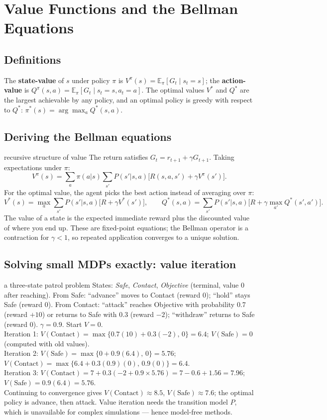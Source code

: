 \documentclass[11pt]{article}
\begin{document}
\section{Value Functions and the Bellman Equations}
\subsection{Definitions}
The \textbf{state-value} of $s$ under policy $\pi$ is $V^\pi(s)=\mathbb E_\pi[G_t\mid s_t=s]$; the \textbf{action-value} is $Q^\pi(s,a)=\mathbb E_\pi[G_t\mid s_t=s,a_t=a]$. The optimal values $V^*$ and $Q^*$ are the largest achievable by any policy, and an optimal policy is greedy with respect to $Q^*$: $\pi^*(s)=\arg\max_aQ^*(s,a)$.

\subsection{Deriving the Bellman equations}
\begin{derivation}{recursive structure of value}
The return satisfies $G_t=r_{t+1}+\gamma G_{t+1}$. Taking expectations under $\pi$:
\[V^\pi(s)=\sum_a\pi(a|s)\sum_{s'}P(s'|s,a)\big[R(s,a,s')+\gamma V^\pi(s')\big].\]
For the optimal value, the agent picks the best action instead of averaging over $\pi$:
\[V^*(s)=\max_a\sum_{s'}P(s'|s,a)\big[R+\gamma V^*(s')\big],\qquad Q^*(s,a)=\sum_{s'}P(s'|s,a)\big[R+\gamma\max_{a'}Q^*(s',a')\big].\]
The value of a state is the expected immediate reward plus the discounted value of where you end up. These are fixed-point equations; the Bellman operator is a contraction for $\gamma<1$, so repeated application converges to a unique solution.
\end{derivation}

\subsection{Solving small MDPs exactly: value iteration}
\begin{example}{a three-state patrol problem}
States: \emph{Safe}, \emph{Contact}, \emph{Objective} (terminal, value 0 after reaching). From Safe: ``advance'' moves to Contact (reward 0); ``hold'' stays Safe (reward 0). From Contact: ``attack'' reaches Objective with probability 0.7 (reward $+10$) or returns to Safe with 0.3 (reward $-2$); ``withdraw'' returns to Safe (reward 0). $\gamma=0.9$. Start $V=0$.\\
Iteration 1: $V(\text{Contact})=\max\{0.7(10)+0.3(-2),\,0\}=6.4$; $V(\text{Safe})=0$ (computed with old values).\\
Iteration 2: $V(\text{Safe})=\max\{0+0.9(6.4),\,0\}=5.76$; $V(\text{Contact})=\max\{6.4+0.3(0.9)(0),\,0.9(0)\}=6.4$.\\
Iteration 3: $V(\text{Contact})=7+0.3(-2+0.9\times5.76)=7-0.6+1.56=7.96$; $V(\text{Safe})=0.9(6.4)=5.76$.\\
Continuing to convergence gives $V(\text{Contact})\approx8.5$, $V(\text{Safe})\approx7.6$; the optimal policy is advance, then attack. Value iteration needs the transition model $P$, which is unavailable for complex simulations --- hence model-free methods.
\end{example}
\end{document}
